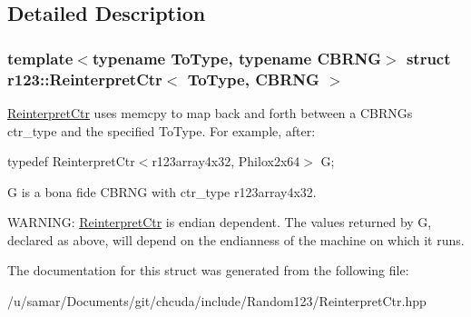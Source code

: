 \subsection{Detailed Description}
\subsubsection*{template$<$typename To\+Type, typename C\+B\+R\+NG$>$\newline
struct r123\+::\+Reinterpret\+Ctr$<$ To\+Type, C\+B\+R\+N\+G $>$}

\hyperlink{structr123_1_1ReinterpretCtr}{Reinterpret\+Ctr} uses memcpy to map back and forth between a C\+B\+R\+NG\textquotesingle{}s ctr\+\_\+type and the specified To\+Type. For example, after\+:

typedef Reinterpret\+Ctr$<$r123array4x32, Philox2x64$>$ G;

G is a bona fide C\+B\+R\+NG with ctr\+\_\+type r123array4x32.

W\+A\+R\+N\+I\+NG\+: \hyperlink{structr123_1_1ReinterpretCtr}{Reinterpret\+Ctr} is endian dependent. The values returned by G, declared as above, will depend on the endianness of the machine on which it runs. 

The documentation for this struct was generated from the following file\+:\begin{DoxyCompactItemize}
\item 
/u/samar/\+Documents/git/chcuda/include/\+Random123/Reinterpret\+Ctr.\+hpp\end{DoxyCompactItemize}
